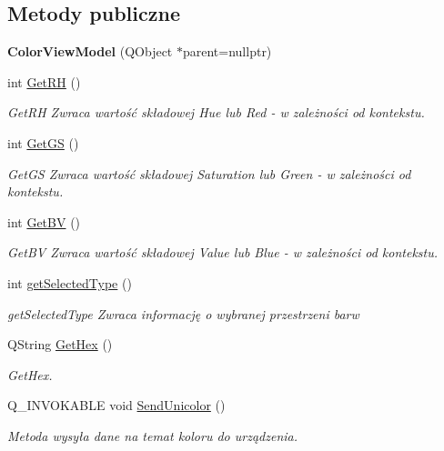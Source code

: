 \subsection*{Metody publiczne}
\begin{DoxyCompactItemize}
\item 
\mbox{\label{class_color_view_model_ac76a50243490a747fecb1c89bc2dd1be}} 
{\bfseries Color\+View\+Model} (Q\+Object $\ast$parent=nullptr)
\item 
int \mbox{\hyperlink{class_color_view_model_a39724a979609cf96d76a905f313b18c6}{Get\+RH}} ()
\begin{DoxyCompactList}\small\item\em Get\+RH Zwraca wartość składowej Hue lub Red -\/ w zależności od kontekstu. \end{DoxyCompactList}\item 
int \mbox{\hyperlink{class_color_view_model_a82022dc5932e3c485e7f387b47251587}{Get\+GS}} ()
\begin{DoxyCompactList}\small\item\em Get\+GS Zwraca wartość składowej Saturation lub Green -\/ w zależności od kontekstu. \end{DoxyCompactList}\item 
int \mbox{\hyperlink{class_color_view_model_ab2ee304b2a6b4ff3945fe926acd575b4}{Get\+BV}} ()
\begin{DoxyCompactList}\small\item\em Get\+BV Zwraca wartość składowej Value lub Blue -\/ w zależności od kontekstu. \end{DoxyCompactList}\item 
int \mbox{\hyperlink{class_color_view_model_a02a51cd04a027d369275cb29229c44c7}{get\+Selected\+Type}} ()
\begin{DoxyCompactList}\small\item\em get\+Selected\+Type Zwraca informację o wybranej przestrzeni barw \end{DoxyCompactList}\item 
Q\+String \mbox{\hyperlink{class_color_view_model_a8288300fcaa560f71974038e0bc191ea}{Get\+Hex}} ()
\begin{DoxyCompactList}\small\item\em Get\+Hex. \end{DoxyCompactList}\item 
\mbox{\label{class_color_view_model_a86906d53218bb80ef563040cb5e7ec30}} 
Q\+\_\+\+I\+N\+V\+O\+K\+A\+B\+LE void \mbox{\hyperlink{class_color_view_model_a86906d53218bb80ef563040cb5e7ec30}{Send\+Unicolor}} ()
\begin{DoxyCompactList}\small\item\em Metoda wysyła dane na temat koloru do urządzenia. \end{DoxyCompactList}\end{DoxyCompactItemize}
